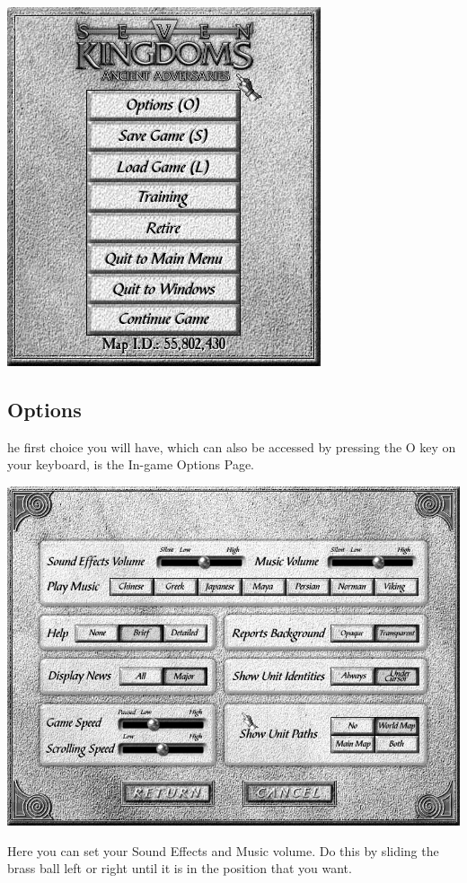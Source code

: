 
\begin{center}
\includegraphics[width=0.5\linewidth]{Imainmenu}
\end{center}

\subsection{Options}

he first choice you will have, which can also be accessed by pressing the O key on your keyboard, is the In-game Options Page.

\begin{center}
	\includegraphics[width=0.9\linewidth]{Ioptions}
\end{center}

Here you can set your Sound Effects and Music volume. Do this by sliding the brass ball left or right until it is in the position that you want.

